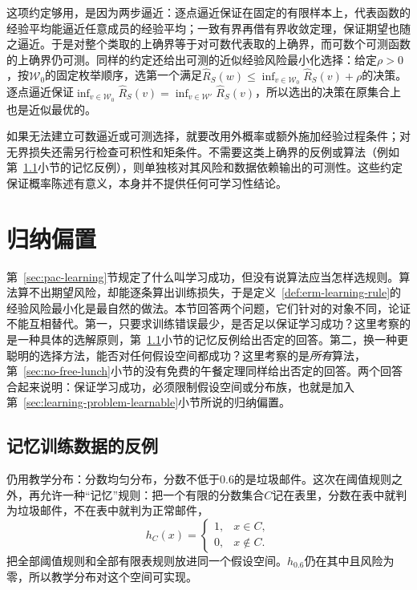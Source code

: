 这项约定够用，是因为两步逼近：逐点逼近保证在固定的有限样本上，代表函数的经验平均能逼近任意成员的经验平均；一致有界再借有界收敛定理，保证期望也随之逼近。于是对整个类取的上确界等于对可数代表取的上确界，而可数个可测函数的上确界仍可测。同样的约定还给出可测的近似经验风险最小化选择：给定$\rho>0$，按$\mathcal W_0$的固定枚举顺序，选第一个满足$\hat R_S(w)\leq\inf_{v\in\mathcal W_0}\hat R_S(v)+\rho$的决策。逐点逼近保证$\inf_{v\in\mathcal W_0}\hat R_S(v)=\inf_{v\in\mathcal W'}\hat R_S(v)$，所以选出的决策在原集合上也是近似最优的。

如果无法建立可数逼近或可测选择，就要改用外概率或额外施加经验过程条件；对无界损失还需另行检查可积性和矩条件。不需要这类上确界的反例或算法（例如第~\ref{sec:memorization-counterexample}小节的记忆反例），则单独核对其风险和数据依赖输出的可测性。这些约定保证概率陈述有意义，本身并不提供任何可学习性结论。

\section{归纳偏置}
\label{sec:inductive-bias}
\label{sec:limits-of-learning}

第~\ref{sec:pac-learning}节规定了什么叫学习成功，但没有说算法应当怎样选规则。算法算不出期望风险，却能逐条算出训练损失，于是定义~\ref{def:erm-learning-rule}的经验风险最小化是最自然的做法。本节回答两个问题，它们针对的对象不同，论证不能互相替代。第一，只要求训练错误最少，是否足以保证学习成功？这里考察的是一种具体的选解原则，第~\ref{sec:memorization-counterexample}小节的记忆反例给出否定的回答。第二，换一种更聪明的选择方法，能否对任何假设空间都成功？这里考察的是\emph{所有}算法，第~\ref{sec:no-free-lunch}小节的没有免费的午餐定理同样给出否定的回答。两个回答合起来说明：保证学习成功，必须限制假设空间或分布族，也就是加入第~\ref{sec:learning-problem-learnable}小节所说的归纳偏置。

\subsection{记忆训练数据的反例}
\label{sec:memorization-counterexample}

仍用教学分布：分数均匀分布，分数不低于0.6的是垃圾邮件。这次在阈值规则之外，再允许一种“记忆”规则：把一个有限的分数集合$C$记在表里，分数在表中就判为垃圾邮件，不在表中就判为正常邮件，
\begin{equation}
  h_C(x)=
  \begin{cases}
    1, & x\in C,\\
    0, & x\notin C.
  \end{cases}
  \label{eq:finite-memory-classifier}
\end{equation}
把全部阈值规则和全部有限表规则放进同一个假设空间。$h_{0.6}$仍在其中且风险为零，所以教学分布对这个空间可实现。

